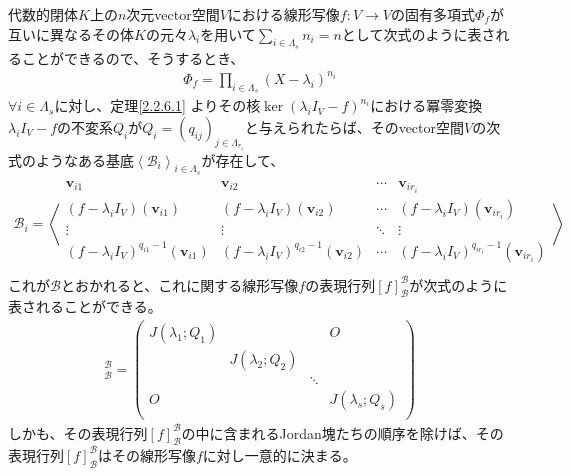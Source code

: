 \documentclass[dvipdfmx]{jsarticle}
\begin{document}
\begin{thm}\label{2.2.6.2}
代数的閉体$K$上の$n$次元vector空間$V$における線形写像$f:V \rightarrow V$の固有多項式$\varPhi_{f}$が互いに異なるその体$K$の元々$\lambda_{i}$を用いて$\sum_{i \in \varLambda_{s}} n_{i} = n$として次式のように表されることができるので、そうするとき、
\begin{align*}
\varPhi_{f} = \prod_{i \in \varLambda_{s}} \left( X - \lambda_{i} \right)^{n_{i}}
\end{align*}
$\forall i \in \varLambda_{s}$に対し、定理\ref{2.2.6.1}
よりその核$\ker\left( \lambda_{i}I_{V} - f \right)^{n_{i}}$における冪零変換$\lambda_{i}I_{V} - f$の不変系$Q_{i}$が$Q_{i} = \left( q_{ij} \right)_{j \in \varLambda_{r_{i}}}$と与えられたらば、そのvector空間$V$の次式のようなある基底$\left\langle \mathcal{B}_{i} \right\rangle_{i \in \varLambda_{s}}$が存在して、
\begin{align*}
\mathcal{B}_{i} = \left\langle \begin{matrix}
\mathbf{v}_{i1} & \mathbf{v}_{i2} & \cdots & \mathbf{v}_{ir_{i}} \\
\left( f - \lambda_{i}I_{V} \right)\left( \mathbf{v}_{i1} \right) & \left( f - \lambda_{i}I_{V} \right)\left( \mathbf{v}_{i2} \right) & \cdots & \left( f - \lambda_{i}I_{V} \right)\left( \mathbf{v}_{ir_{i}} \right) \\
 \vdots & \vdots & \ddots & \vdots \\
\left( f - \lambda_{i}I_{V} \right)^{q_{i1} - 1}\left( \mathbf{v}_{i1} \right) & \left( f - \lambda_{i}I_{V} \right)^{q_{i2} - 1}\left( \mathbf{v}_{i2} \right) & \cdots & \left( f - \lambda_{i}I_{V} \right)^{q_{ir_{i}} - 1}\left( \mathbf{v}_{ir_{i}} \right) \\
\end{matrix} \right\rangle
\end{align*}
これが$\mathcal{B}$とおかれると、これに関する線形写像$f$の表現行列$[ f]_{\mathcal{B}}^{\mathcal{B}}$が次式のように表されることができる。
\begin{align*}
[ f]_{\mathcal{B}}^{\mathcal{B}} = \begin{pmatrix}
J\left( \lambda_{1};Q_{1} \right) & \  & \  & O \\
\  & J\left( \lambda_{2};Q_{2} \right) & \  & \  \\
\  & \  & \ddots & \  \\
O & \  & \  & J\left( \lambda_{s};Q_{s} \right) \\
\end{pmatrix}
\end{align*}
しかも、その表現行列$[ f]_{\mathcal{B}}^{\mathcal{B}}$の中に含まれるJordan塊たちの順序を除けば、その表現行列$[ f]_{\mathcal{B}}^{\mathcal{B}}$はその線形写像$f$に対し一意的に決まる。
\end{thm}
\end{document}
